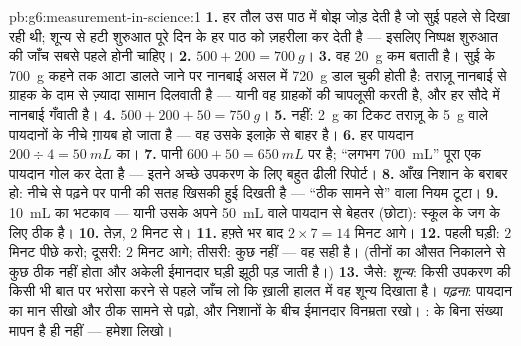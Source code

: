 \begin{solution}{pb:g6:measurement-in-science:1}
\textbf{1.} हर तौल उस पाठ में बोझ जोड़ देती है जो सुई पहले से दिखा
रही थी; शून्य से हटी शुरुआत पूरे दिन के हर पाठ को ज़हरीला कर देती है
--- इसलिए निष्पक्ष शुरुआत की जाँच सबसे पहले होनी चाहिए।
\textbf{2.} $500 + 200 = \qty{700}{g}$।
\textbf{3.} वह \qty{20}{g} कम बताती है। सुई के \qty{700}{g} कहने
तक आटा डालते जाने पर नानबाई असल में \qty{720}{g} डाल चुकी होती है:
तराज़ू नानबाई से ग्राहक के दाम से ज़्यादा सामान दिलवाती है --- यानी वह
ग्राहकों की चापलूसी करती है, और हर सौदे में नानबाई गँवाती है।
\textbf{4.} $500 + 200 + 50 = \qty{750}{g}$।
\textbf{5.} नहीं: \qty{2}{g} का टिकट तराज़ू के \qty{5}{g} वाले
पायदानों के नीचे ग़ायब हो जाता है --- वह उसके इलाक़े से बाहर है।
\textbf{6.} हर पायदान $200 \div 4 = \qty{50}{mL}$ का।
\textbf{7.} पानी $600 + 50 = \qty{650}{mL}$ पर है; ``लगभग
\qty{700}{mL}'' पूरा एक पायदान गोल कर देता है --- इतने अच्छे उपकरण
के लिए बहुत ढीली रिपोर्ट।
\textbf{8.} आँख निशान के बराबर हो: नीचे से पढ़ने पर पानी की सतह
खिसकी हुई दिखती है --- ``ठीक सामने से'' वाला नियम टूटा।
\textbf{9.} \qty{10}{mL} का भटकाव --- यानी उसके अपने \qty{50}{mL}
वाले पायदान से बेहतर (छोटा): स्कूल के जग के लिए ठीक है।
\textbf{10.} तेज़, $2$ मिनट से।
\textbf{11.} हफ़्ते भर बाद $2 \times 7 = 14$ मिनट आगे।
\textbf{12.} पहली घड़ी: $2$ मिनट पीछे करो; दूसरी: $2$ मिनट आगे;
तीसरी: कुछ नहीं --- वह सही है। (तीनों का औसत निकालने से कुछ ठीक नहीं
होता और अकेली ईमानदार घड़ी झूठी पड़ जाती है।)
\textbf{13.} जैसे: \emph{शून्य}: किसी उपकरण की किसी भी बात पर भरोसा
करने से पहले जाँच लो कि ख़ाली हालत में वह शून्य दिखाता है।
\emph{पढ़ना}: पायदान का मान सीखो और ठीक सामने से पढ़ो, और निशानों के
बीच ईमानदार विनम्रता रखो। \emph{}:  के बिना संख्या मापन
है ही नहीं ---  हमेशा लिखो।
\end{solution}
